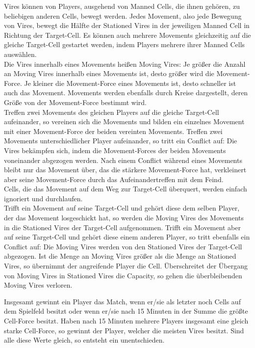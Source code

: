 Vires können von Players, ausgehend von Manned Cells, die ihnen gehören, zu beliebigen anderen Cells, bewegt werden. 
Jedes Movement, also jede Bewegung von Vires, bewegt die Hälfte der Stationed Vires in der jeweiligen Manned Cell in Richtung der Target-Cell.
Es können auch mehrere Movements gleichzeitig auf die gleiche Target-Cell gestartet werden, indem Players mehrere ihrer Manned Cells auswählen. \\
Die Vires innerhalb eines Movements heißen Moving Vires: Je größer die Anzahl an Moving Vires innerhalb eines Movements ist, desto größer wird die Movement-Force.
Je kleiner die Movement-Force eines Movements ist, desto schneller ist auch das Movement.
Movements werden ebenfalls durch Kreise dargestellt, deren Größe von der Movement-Force bestimmt wird. \\
Treffen zwei Movements des gleichen Players auf die gleiche Target-Cell aufeinander, so vereinen sich die Movements und bilden ein einzelnes Movement mit einer Movement-Force der beiden vereinten Movements.
Treffen zwei Movements unterschiedlicher Player aufeinander, so tritt ein Conflict auf: Die Vires bekämpfen sich, indem die Movement-Forces der beiden Movements voneinander abgezogen werden. Nach einem Conflict während eines Movements bleibt nur das Movement über, das die stärkere Movement-Force hat, verkleinert aber seine Movement-Force durch das Aufeinandertreffen mit dem Feind. \\
Cells, die das Movement auf dem Weg zur Target-Cell überquert, werden einfach ignoriert und durchlaufen. \\
Trifft ein Movement auf seine Target-Cell und gehört diese dem selben Player, der das Movement losgeschickt hat, so werden die Moving Vires des Movements in die Stationed Vires der Target-Cell aufgenommen.
Trifft ein Movement aber auf seine Target-Cell und gehört diese einem anderen Player, so tritt ebenfalls ein Conflict auf: Die Moving Vires werden von den Stationed Vires der Target-Cell abgezogen. Ist die Menge an Moving Vires größer als die Menge an Stationed Vires, so übernimmt der angreifende Player die Cell.
Überschreitet der Übergang von Moving Vires in Stationed Vires die Capacity, so gehen die überbleibenden Moving Vires verloren.

Insgesamt gewinnt ein Player das Match, wenn er/sie als letzter noch Cells auf dem Spielfeld besitzt oder wenn er/sie nach 15 Minuten in der Summe die größte Cell-Force besitzt. Haben nach 15 Minuten mehrere Players insgesamt eine gleich starke Cell-Force, so gewinnt der Player, welcher die meisten Vires besitzt. Sind alle diese Werte gleich, so entsteht ein unentschieden.